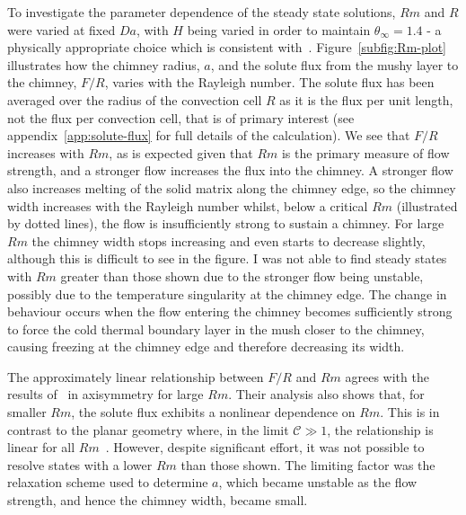 \documentclass[11pt]{proc}
\newcommand{\CompRatio}{\mathscr{C}}
\begin{document}
To investigate the parameter dependence of the steady state solutions, $Rm$ and $R$ were varied at fixed $Da$, with $H$ being varied in order to maintain $\theta_\infty=1.4$ - a physically appropriate choice which is consistent with~\citet*{rees-jones-worster-13}. Figure~\ref{subfig:Rm-plot} illustrates how the chimney radius, $a$, and the solute flux from the mushy layer to the chimney, $F/R$, varies with the Rayleigh number. The solute flux has been averaged over the radius of the convection cell $R$ as it is the flux per unit length, not the flux per convection cell, that is of primary interest (see appendix~\ref{app:solute-flux} for full details of the calculation). We see that $F/R$ increases with $Rm$, as is expected given that $Rm$ is the primary measure of flow strength, and a stronger flow increases the flux into the chimney. A stronger flow also increases melting of the solid matrix along the chimney edge, so the chimney width increases with the Rayleigh number whilst, below a critical $Rm$ (illustrated by dotted lines), the flow is insufficiently strong to sustain a chimney. For large $Rm$ the chimney width stops increasing and even starts to decrease slightly, although this is difficult to see in the figure. I was not able to find steady states with $Rm$ greater than those shown due to the stronger flow being unstable, possibly due to the temperature singularity at the chimney edge. The change in behaviour occurs when the flow entering the chimney becomes sufficiently strong to force the cold thermal boundary layer in the mush closer to the chimney, causing freezing at the chimney edge and therefore decreasing its width. 

The approximately linear relationship between $F/R$ and $Rm$ agrees with the results of~\citet*{rees-jones-worster-13} in axisymmetry for large $Rm$. Their analysis also shows that, for smaller $Rm$, the solute flux exhibits a nonlinear dependence on $Rm$. This is in contrast to the planar geometry where, in the limit $\CompRatio \gg 1$, the relationship is linear for all $Rm$~\citep*{wells-et-al-13}. However, despite significant effort, it was not possible to resolve states with a lower $Rm$ than those shown. The limiting factor was the relaxation scheme used to determine $a$, which became unstable as the flow strength, and hence the chimney width, became small.
\end{document}
